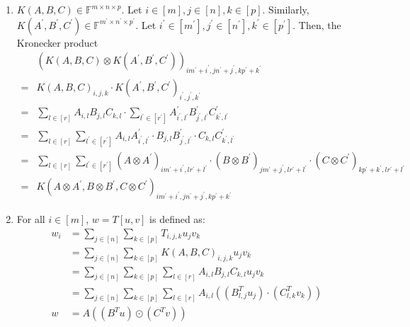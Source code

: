 \documentclass[11pt,a4paper]{article}
\begin{document}
\begin{enumerate}
\begin{enumerate}
              \item $K(A, B, C) \in \mathbb{F}^{m \times n \times p}$. Let $i \in [m], j \in [n], k \in [p]$. Similarly,
                    $K(A^\prime, B^\prime, C^\prime) \in \mathbb{F}^{m^\prime \times n^\prime \times p^\prime}$.
                    Let $i^\prime \in [m^\prime], j^\prime \in [n^\prime], k^\prime \in [p^\prime]$.
                    Then, the Kronecker product
                    \begin{align*}
                          & (K(A, B, C) \otimes K(A^\prime, B^\prime, C^\prime))_{i m^\prime + i^\prime, j n^\prime + j^\prime, k p^\prime + k^\prime}          \\
                        = & K(A, B, C)_{i, j, k} \cdot K(A^\prime, B^\prime, C^\prime)_{i^\prime, j^\prime, k^\prime}                                           \\
                        = & \sum_{l \in [r]} A_{i, l} B_{j, l} C_{k, l} \cdot
                        \sum_{l^\prime \in [r^\prime]}  A_{i^\prime, l^\prime}^\prime B_{j^\prime, l^\prime}^\prime C_{k^\prime, l^\prime}^\prime               \\
                        = & \sum_{l \in [r]} \sum_{l^\prime \in [r^\prime]} A_{i, l}A^\prime_{i^\prime, l^\prime} \cdot B_{j, l}B^\prime_{j^\prime, l^\prime}
                        \cdot C_{k,l}C^\prime_{k^\prime, l^\prime}                                                                                              \\
                        = & \sum_{l \in [r]} \sum_{l^\prime \in [r^\prime]} (A \otimes A^\prime)_{i m^\prime + i^\prime, l r^\prime + l^\prime} \cdot
                        (B \otimes B^\prime)_{j m^\prime + j^\prime, l r^\prime + l^\prime} \cdot
                        (C \otimes C^\prime)_{k p^\prime + k^\prime, l r^\prime + l^\prime}                                                                     \\
                        = & K(A \otimes A^\prime, B \otimes B^\prime, C \otimes C^\prime)_{i m^\prime + i^\prime, j n^\prime + j^\prime, k p^\prime + k^\prime}
                    \end{align*}
              \item For all $i \in [m]$, $w = T[u, v]$ is defined as:
                    \begin{align*}
                        w_i & = \sum_{j \in [n]} \sum_{k \in [p]} T_{i, j, k} u_j v_k                                           \\
                            & = \sum_{j \in [n]} \sum_{k \in [p]} K(A, B, C)_{i, j, k}  u_j v_k                                 \\
                            & = \sum_{j \in [n]} \sum_{k \in [p]} \sum_{l \in [r]} A_{i, l} B_{j, l} C_{k, l} u_j v_k           \\
                            & = \sum_{j \in [n]} \sum_{k \in [p]} \sum_{l \in [r]} A_{i, l} ((B_{l, j}^T u_j) \cdot (C_{l, k}^T v_k)) \\
                        w   & = A((B^T u) \odot (C^T v))
                    \end{align*}


\end{enumerate}
\end{enumerate}
\end{document}
